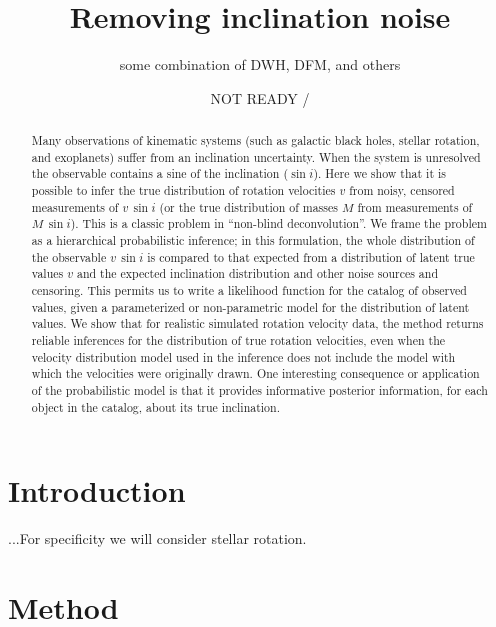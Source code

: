 \documentclass[12pt, preprint]{aastex}
\begin{document}
\title{Removing inclination noise}
\author{some combination of DWH, DFM, and others}
\date{NOT READY / \texttt{\githash}}

\begin{abstract}
Many observations of kinematic systems (such as galactic black holes,
stellar rotation, and exoplanets) suffer from an inclination
uncertainty.
When the system is unresolved the observable contains a sine of the
inclination ($\sin i$).
Here we show that it is possible to infer the true distribution of
rotation velocities $v$ from noisy, censored measurements of $v\,\sin
i$ (or the true distribution of masses $M$ from measurements of
$M\,\sin i$).
This is a classic problem in ``non-blind deconvolution''.
We frame the problem as a hierarchical probabilistic inference; in
this formulation, the whole distribution of the observable $v\,\sin i$
is compared to that expected from a distribution of latent true
values $v$ and the expected inclination distribution and other noise
sources and censoring.
This permits us to write a likelihood function for the catalog of
observed values, given a parameterized or non-parametric model for the
distribution of latent values.
We show that for realistic simulated rotation velocity data, the
method returns reliable inferences for the distribution of true
rotation velocities, even when the velocity distribution model used in
the inference does not include the model with which the velocities
were originally drawn.
One interesting consequence or application of the probabilistic model
is that it provides informative posterior information, for each object
in the catalog, about its true inclination.
\end{abstract}

\section{Introduction}

...For specificity we will consider stellar rotation.

\section{Method}
\end{document}

